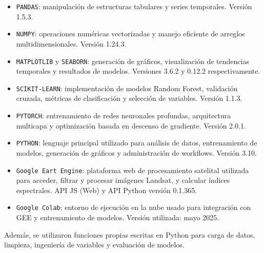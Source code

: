 \begin{itemize}
    \item \texttt{PANDAS}: manipulación de estructuras tabulares y series temporales. Versión 1.5.3.
    \item \texttt{NUMPY}: operaciones numéricas vectorizadas y manejo eficiente de arreglos multidimensionales. Versión 1.24.3.
    \item \texttt{MATPLOTLIB} y \texttt{SEABORN}: generación de gráficos, visualización de tendencias temporales y resultados de modelos. Versiones 3.6.2 y 0.12.2 respectivamente.
    \item \texttt{SCIKIT-LEARN}: implementación de modelos Random Forest, validación cruzada, métricas de clasificación y selección de variables. Versión 1.1.3.
    \item \texttt{PYTORCH}: entrenamiento de redes neuronales profundas, arquitectura multicapa y optimización basada en descenso de gradiente. Versión 2.0.1.
    \item \texttt{PYTHON}: lenguaje principal utilizado para análisis de datos, entrenamiento de modelos, generación de gráficos y administración de workflows. Versión 3.10.
    \item \texttt{Google Eart Engine}: plataforma web de procesamiento satelital utilizada para acceder, filtrar y procesar imágenes Landsat, y calcular índices espectrales. API JS (Web) y API Python versión 0.1.365.
    \item \texttt{Google Colab}: entorno de ejecución en la nube usado para integración con GEE y entrenamiento de modelos. Versión utilizada: mayo 2025.
\end{itemize}



Además, se utilizaron funciones propias escritas en Python para carga de datos, limpieza, ingeniería de variables y evaluación de modelos.



